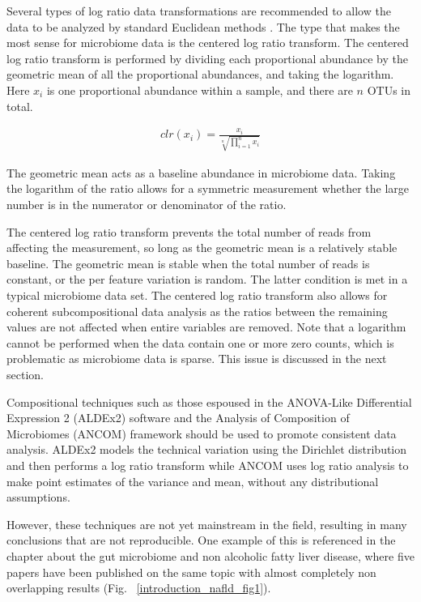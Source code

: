 Several types of log ratio data transformations are recommended to allow the data to be analyzed by standard Euclidean methods \cite{aitchison1982statistical}. The type that makes the most sense for microbiome data is the centered log ratio transform. The centered log ratio transform is performed by dividing each proportional abundance by the geometric mean of all the proportional abundances, and taking the logarithm. Here $x_i$ is one proportional abundance within a sample, and there are $n$ OTUs in total.

\begin{align*}
clr(x_i) = \frac{x_i}{\sqrt[n]{\prod_{i=1}^{n} x_i}}
\end{align*}

The geometric mean acts as a baseline abundance in microbiome data. Taking the logarithm of the ratio allows for a symmetric measurement whether the large number is in the numerator or denominator of the ratio.

The centered log ratio transform prevents the total number of reads from affecting the measurement, so long as the geometric mean is a relatively stable baseline. The geometric mean is stable when the total number of reads is constant, or the per feature variation is random. The latter condition is met in a typical microbiome data set. The centered log ratio transform also allows for coherent subcompositional data analysis as the ratios between the remaining values are not affected when entire variables are removed. Note that a logarithm cannot be performed when the data contain one or more zero counts, which is problematic as microbiome data is sparse. This issue is discussed in the next section.

Compositional techniques such as those espoused in the ANOVA-Like Differential Expression 2 (ALDEx2) software \cite{fernandes2014unifying} and the Analysis of Composition of Microbiomes (ANCOM) framework \cite{mandal2015analysis} should be used to promote consistent data analysis. ALDEx2 models the technical variation using the Dirichlet distribution and then performs a log ratio transform while ANCOM uses log ratio analysis to make point estimates of the variance and mean, without any distributional assumptions.

However, these techniques are not yet mainstream in the field, resulting in many conclusions that are not reproducible. One example of this is referenced in the chapter about the gut microbiome and non alcoholic fatty liver disease, where five papers have been published on the same topic with almost completely non overlapping results (Fig. ~\ref{introduction_nafld_fig1}).

